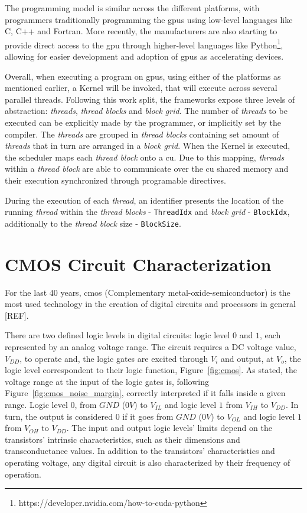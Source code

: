 The programming model is similar across the different platforms, with programmers traditionally programming the \acrshort{gpu}s using low-level languages like C, C++ and Fortran. More recently, the manufacturers are also starting to provide direct access to the \acrshort{gpu} through higher-level languages like Python\footnote{https://developer.nvidia.com/how-to-cuda-python}, allowing for easier development and adoption of \acrshort{gpu}s as accelerating devices.

Overall, when executing a program on \acrshort{gpu}s, using either of the platforms as mentioned earlier, a Kernel will be invoked, that will execute across several parallel threads. Following this work split, the frameworks expose three levels of abstraction: \textit{threads}, \textit{thread blocks} and  \textit{block grid}. The number of \textit{threads} to be executed can be explicitly made by the programmer, or implicitly set by the compiler. The \textit{threads} are grouped in \textit{thread blocks} containing set amount of \textit{threads} that in turn are arranged in a \textit{block grid}. When the Kernel is executed, the scheduler maps each \textit{thread block} onto a \acrshort{cu}. Due to this mapping, \textit{threads} within a \textit{thread block} are able to communicate over the \acrshort{cu} shared memory and their execution synchronized through programable directives.

During the execution of each \textit{thread}, an identifier presents the location of the running \textit{thread} within the \textit{thread blocks} - \texttt{ThreadIdx} and  \textit{block grid} - \texttt{BlockIdx}, additionally to the \textit{thread block} size - \texttt{BlockSize}. 

\section{CMOS Circuit Characterization}
\label{section:CMOS}

For the last 40 years, \acrshort{cmos} (Complementary metal-oxide-semiconductor) is the most used technology in the creation of digital circuits and processors in general [REF]. 

There are two defined logic levels in digital circuits: logic level $0$ and $1$, each represented by an analog voltage range. The circuit requires a DC voltage value, $V_{DD}$, to operate and, the logic gates are excited through $V_{i}$ and output, at $V_o$, the logic level correspondent to their logic function, Figure~\ref{fig:cmos}. As stated, the voltage range at the input of the logic gates is, following Figure~\ref{fig:cmos_noise_margin}, correctly interpreted if it falls inside a given range. Logic level $0$, from $GND$ ($0V$) to $V_{IL}$ and logic level $1$ from $V_{IH}$ to $V_{DD}$. In turn, the output is considered $0$ if it goes from $GND$ ($0V$) to $V_{OL}$ and logic level $1$ from $V_{OH}$ to $V_{DD}$. The input and output logic levels' limits depend on the transistors' intrinsic characteristics, such as their dimensions and transconductance values. In addition to the transistors' characteristics and operating voltage, any digital circuit is also characterized by their frequency of operation.

